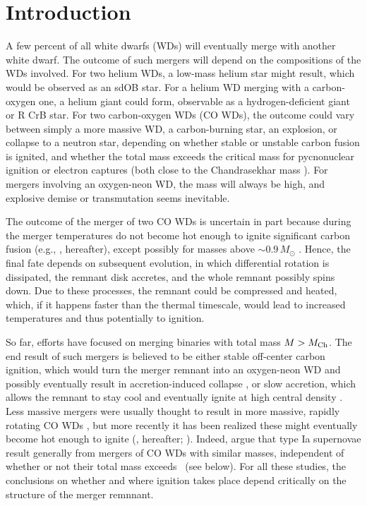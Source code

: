 \section{Introduction}
\label{sec:c2_intro}

A few percent of all white dwarfs (WDs) will eventually merge with another white dwarf.  The outcome of such mergers will depend on the compositions of the WDs involved.  For two helium WDs, a low-mass helium star might result, which would be observed as an sdOB star.  For a helium WD merging with a carbon-oxygen one, a helium giant could form, observable as a hydrogen-deficient giant or R CrB star.  For two carbon-oxygen WDs (CO WDs), the outcome could vary between simply a more massive WD, a carbon-burning star, an explosion, or collapse to a neutron star, depending on whether stable or unstable carbon fusion is ignited, and whether the total mass exceeds the critical mass for pycnonuclear ignition or electron captures (both close to the Chandrasekhar mass \Mch).  For mergers involving an oxygen-neon WD, the mass will always be high, and explosive demise or transmutation seems inevitable.

The outcome of the merger of two CO WDs is uncertain in part because during the merger temperatures do not become hot enough to ignite significant carbon fusion (e.g., \citealt{loreig09}, \citeal{loreig09} hereafter), except possibly for masses above $\sim\!0.9\,M_\odot$ \citep{pakm+11,pakm+12}.  Hence, the final fate depends on subsequent evolution, in which differential rotation is dissipated, the remnant disk accretes, and the whole remnant possibly spins down.  Due to these processes, the remnant could be compressed and heated, which, if it happens faster than the thermal timescale, would lead to increased temperatures and thus potentially to ignition.  

So far, efforts have focused on merging binaries with total mass $M>\Mch$.  The end result of such mergers is believed to be either stable off-center carbon ignition, which would turn the merger remnant into an oxygen-neon WD and possibly eventually result in accretion-induced collapse \citep{saion98}, or slow accretion, which allows the remnant to stay cool and eventually ignite at high central density \citep{yoonpr07}.  Less massive mergers were usually thought to result in more massive, rapidly rotating CO WDs \citep{segrcm97,kube+10}, but more recently it has been realized these might eventually become hot enough to ignite (\citealt{vkercj10}, \citeal{vkercj10} hereafter; \citealt{shen+12,schw+12}).  Indeed, \citeal{vkercj10} argue that type Ia supernovae result generally from mergers of CO WDs with similar masses, independent of whether or not their total mass exceeds \Mch\ (see below).  For all these studies, the conclusions on whether and where ignition takes place depend critically on the structure of the merger remnnant.

